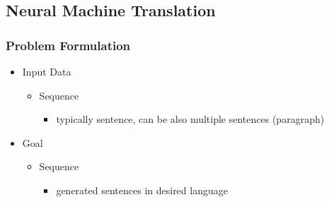 \subsection{Neural Machine Translation}
\subsubsection{Problem Formulation}
\begin{itemize}
\item Input Data
	\begin{itemize}
	\item Sequence 
		\begin{itemize}
		\item typically sentence, can be also multiple sentences (paragraph)
		\end{itemize}
	\end{itemize}
\item Goal
	\begin{itemize}
	\item Sequence
		\begin{itemize}
		\item generated sentences in desired language
		\end{itemize}
	\end{itemize}
\end{itemize}

